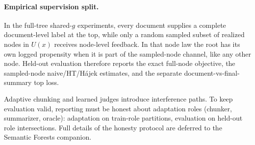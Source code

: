 \paragraph{Empirical supervision split.}
In the full-tree shared-$g$ experiments, every document supplies a complete document-level label at the top, while only a random sampled subset of realized nodes in $U(x)$ receives node-level feedback. In that node law the root has its own logged propensity when it is part of the sampled-node channel, like any other node. Held-out evaluation therefore reports the exact full-node objective, the sampled-node naive/HT/H\'ajek estimates, and the separate document-vs-final-summary top loss.

Adaptive chunking and learned judges introduce interference paths. To keep evaluation valid, reporting must be honest about adaptation roles (chunker, summarizer, oracle): adaptation on train-role partitions, evaluation on held-out role intersections. Full details of the honesty protocol are deferred to the Semantic Forests companion.
